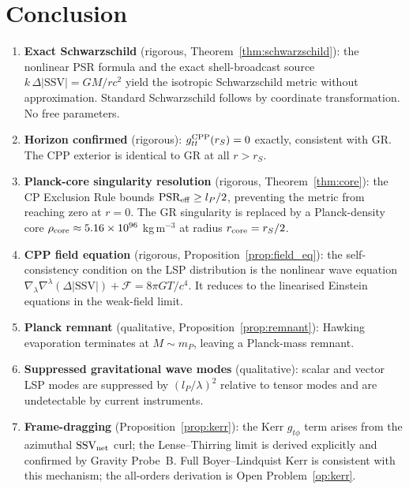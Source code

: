 \documentclass[12pt]{article}
\newcommand{\lP}{l_P}
\newcommand{\mP}{m_P}
\newcommand{\SSV}{\text{SSV}}
\newcommand{\PSR}{\text{PSR}}
\begin{document}
\section{Conclusion}
\label{sec:conclusion}

\begin{enumerate}
  \item \textbf{Exact Schwarzschild} (rigorous, Theorem~\ref{thm:schwarzschild}):
    the nonlinear PSR formula and the exact shell-broadcast source
    $k\,\Delta|\SSV| = GM/rc^2$ yield the isotropic Schwarzschild
    metric without approximation.  Standard Schwarzschild follows
    by coordinate transformation.  No free parameters.

  \item \textbf{Horizon confirmed} (rigorous): $g_{tt}^{\rm CPP}(r_S) = 0$
    exactly, consistent with GR.  The CPP exterior is identical to GR
    at all $r > r_S$.

  \item \textbf{Planck-core singularity resolution}
    (rigorous, Theorem~\ref{thm:core}): the CP Exclusion Rule bounds
    $\PSR_{\rm eff} \geq \lP/2$, preventing the metric from reaching
    zero at $r = 0$.  The GR singularity is replaced by a
    Planck-density core $\rho_{\rm core} \approx 5.16\times 10^{96}$
    kg\,m$^{-3}$ at radius $r_{\rm core} = r_S/2$.

  \item \textbf{CPP field equation} (rigorous,
    Proposition~\ref{prop:field_eq}): the self-consistency condition
    on the LSP distribution is the nonlinear wave equation
    $\nabla_\lambda\nabla^\lambda(\Delta|\SSV|) + \mathcal{F} =
    8\pi G T/c^4$.  It reduces to the linearised Einstein equations
    in the weak-field limit.

  \item \textbf{Planck remnant} (qualitative,
    Proposition~\ref{prop:remnant}): Hawking evaporation terminates
    at $M \sim \mP$, leaving a Planck-mass remnant.

  \item \textbf{Suppressed gravitational wave modes} (qualitative):
    scalar and vector LSP modes are suppressed by $(\lP/\lambda)^2$
    relative to tensor modes and are undetectable by current instruments.

  \item \textbf{Frame-dragging} (Proposition~\ref{prop:kerr}):
    the Kerr $g_{t\phi}$ term arises from the azimuthal
    $\SSV_{\rm net}$ curl; the Lense--Thirring limit is derived
    explicitly and confirmed by Gravity Probe~B.  Full Boyer--Lindquist
    Kerr is consistent with this mechanism; the all-orders derivation
    is Open Problem~\ref{op:kerr}.
\end{enumerate}
\end{document}
